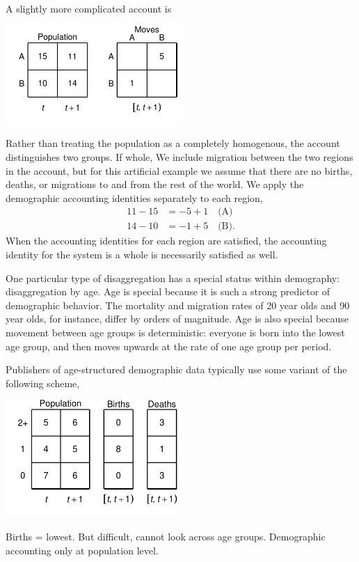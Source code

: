 \documentclass[USenglish]{article}
\begin{document}
A slightly more complicated account is
\begin{center}
\includegraphics[width=0.5\textwidth]{figures_accounts/fig_account_region.pdf}
\end{center}
Rather than treating the population as a completely homogenous, the account distinguishes two groups. If  whole,  
We include migration between the two regions in the account, but for this artificial example we assume that there are no births, deaths, or migrations to and from the rest of the world. We apply the demographic accounting identities separately to each region,
\begin{align*}
    11 - 15 & = -5 + 1 \quad \text{(A)}\\
    14 - 10 & = -1 + 5 \quad \text{(B)}.
\end{align*}
When the accounting identities for each region are satisfied, the accounting identity for the system is a whole is necessarily satisfied as well.

One particular type of disaggregation has a special status within demography: disaggregation by age. Age is special because it is such a strong predictor of demographic behavior. The mortality and migration rates of 20 year olds and 90 year olds, for instance, differ by orders of magnitude. Age is also special because movement between age groups is deterministic: everyone is born into the lowest age group, and then moves upwards at the rate of one age group per period.

Publishers of age-structured demographic data typically use some variant of the following scheme,
\begin{center}
\includegraphics[width=0.5\textwidth]{figures_accounts/fig_account_withage2.pdf}
\end{center}
Births = lowest. But difficult, cannot look across age groups. Demographic accounting only at population level.
\end{document}
